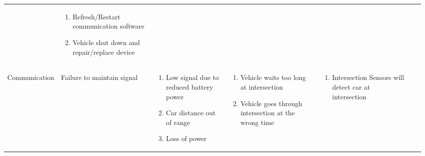 \documentclass [10pt]{article}
\begin{document}
{{\begin{minipage}{\textwidth}
\begin{longtable}{ |p{ }  | p{ } |  p{ } |  p{ } | p{ } | p{ } |  p{ }|}
    
    & \begin{minipage}{.24 \columnwidth} 
                \vspace{2mm}
                \begin{enumerate}
                    \item Refresh/Restart communication software
                    \item Vehicle shut down and repair/replace device\vspace {1mm}
                \end{enumerate}
        \end{minipage} \\ \cline{2-7}
    
    \multirow{-5}{*}{\begin{minipage} {.12\columnwidth}
    \begin{center} \small Communication \end{center}
    \end{minipage}\cellcolor{subsectionC} }
    & \cellcolor{tableCell}\begin{minipage} {.19\columnwidth}
            \begin{center}Failure to maintain signal \end{center}
        \end{minipage} 
    & \cellcolor{tableCell}\begin{minipage}{.22\textwidth} 
                \begin{enumerate}
                    \item Low signal due to reduced battery power
                    \item Car distance out of range
                    \item Loss of power \vspace {1mm}
                \end{enumerate}
        \end{minipage}
    & \cellcolor{tableCell}\begin{minipage}{.22\textwidth} 
                \vspace{2mm}
                \begin{enumerate}
                    \item Vehicle waits too long at intersection
                    \item Vehicle goes through intersection at the wrong time \vspace {1mm}
                \end{enumerate}
        \end{minipage}
    & \cellcolor{tableCell}\begin{minipage}{.18\textwidth} 
                \begin{enumerate}
                    \item Intersection Sensors will detect car at intersection \vspace {1mm}
                \end{enumerate}
        \end{minipage}
    & \cellcolor{tableCell} 
    

\end{longtable}
\end{minipage}}}
\end{document}
